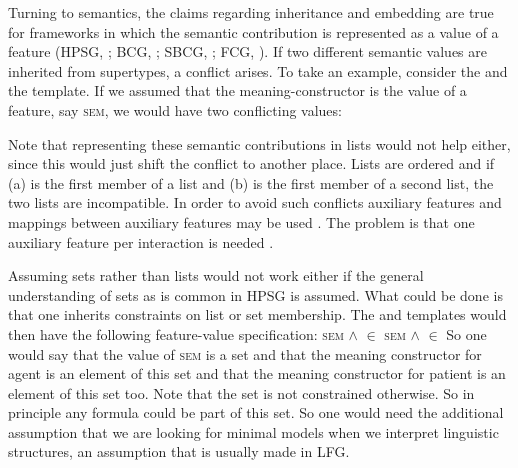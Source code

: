 Turning to semantics, the claims regarding inheritance and embedding are true for frameworks in which
the semantic contribution is represented as a value of a feature (HPSG, \citealt{ps2,Sag97a}; BCG,
\citealt{KF99a}; SBCG, \citealt{Sag2012a}; FCG, \citealt{SteelsFluid-ed}). If two different semantic values are inherited from
supertypes, a conflict arises. To take an example, consider the  and the
 template. If we assumed that the meaning-constructor is the value of a feature,
say \textsc{sem}, we would have two conflicting values:
\eal
\ex {}
\ex {}
\zl


Note that representing these semantic contributions in lists would not help either, since this would
just shift the conflict to another place. Lists are ordered and if (a) is the first member of
a list and (b) is the first member of a second list, the two lists are incompatible. 
In order to avoid such conflicts auxiliary features and mappings
between auxiliary features may be used \citep{Koenig99a}. The problem is that one auxiliary feature
per interaction is needed \citep[Section~7.5.2.2]{MuellerLehrbuch1}.

Assuming sets rather than lists would not work either if the general understanding of sets as is
common in HPSG \citep{PM90a} is assumed. What could be done is that one inherits constraints on list
or set membership. The \templaten{agent} and \templaten{patient} templates would then have the
following feature-value specification:
\eal
\ex \textsc{sem} \ibox{1} $\wedge$  $\in$ 
\ex \textsc{sem}  $\wedge$  $\in$ 
\zl
So one would say that the value of \textsc{sem} is a set  and that the meaning constructor for agent
is an element of this set and that the meaning constructor for patient is an element of this set
too. Note that the set is not constrained otherwise. So in principle any formula could be part of
this set. So one would need the additional assumption that we are looking for minimal models when we
interpret linguistic structures, an assumption that is usually made in LFG.



